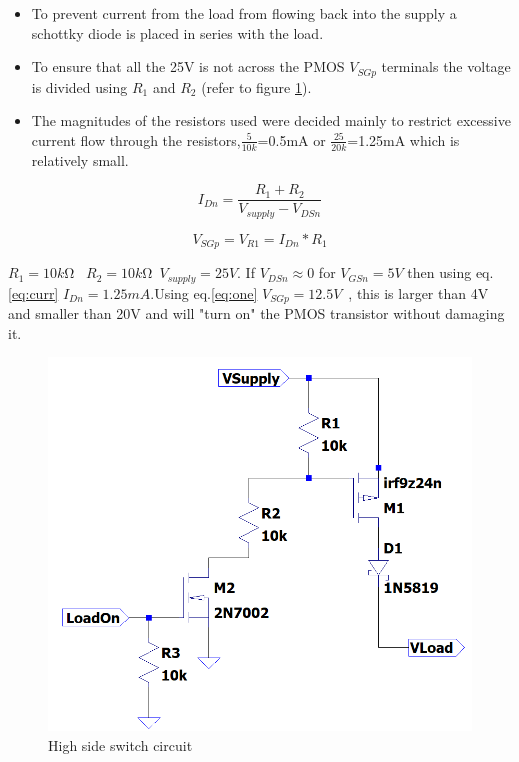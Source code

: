 \begin{itemize}
 \item To prevent current from the load from flowing back into the supply a schottky diode is placed in series with the load.
\item To ensure that all the 25V is not across the PMOS $V_{SGp}$ terminals the voltage is divided using $R_1$ and $R_2$ (refer to figure \ref{fig:high}).
\item The magnitudes of the resistors used were decided mainly to restrict excessive current flow through the resistors,$\frac{5}{10k}$=0.5mA or $\frac{25}{20k}$=1.25mA which is relatively small.
\end{itemize}



    \begin{equation}
        I_{Dn}=\frac{R_1+R_2}{V_{supply}-V_{DSn}}
        \label{eq:curr}
    \end{equation}

\begin{equation}
V_{SGp}=V_{R1}=I_{Dn}*R_1   
\label{eq:one}
\end{equation}



    $R_{1}=10k$\si{\ohm} \ $R_{2}=10k$\si{\ohm}\ $V_{supply}=25V$. If $V_{DSn}\approx0 $ for $ V_{GSn}=5V$  then using eq.\ref{eq:curr} $I_{Dn}=1.25mA$.Using eq.\ref{eq:one} $V_{SGp}=12.5V$\ , this is larger than 4V and smaller than 20V and will "turn on" the PMOS transistor without damaging it. 

 


\begin{figure}[!htb]
\centering
\includegraphics[scale=0.28]{Figures/Highside.png}
\caption{High side\textbf{} switch circuit}
\label{fig:high}
\end{figure}



